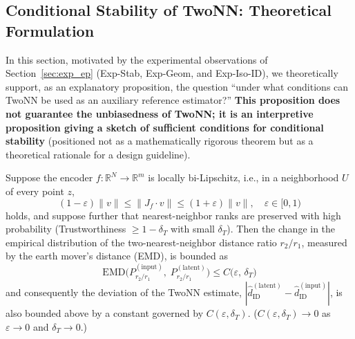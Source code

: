 \documentclass[make,article,submit,pdftex,moreauthors]{Definitions/mdpi}
\newcommand{\R}{\mathbb{R}}
\begin{document}
\subsection{Conditional Stability of TwoNN: Theoretical Formulation}\label{sec:theory_stability}

In this section, motivated by the experimental observations of
Section~\ref{sec:exp_ep} (Exp-Stab, Exp-Geom, and Exp-Iso-ID),
we theoretically support, as an explanatory proposition, the question
``under what conditions can TwoNN be used as an auxiliary reference estimator?''
\textbf{This proposition does not guarantee the unbiasedness of TwoNN;
it is an interpretive proposition giving a sketch of sufficient conditions for
conditional stability}
(positioned not as a mathematically rigorous theorem but as a theoretical rationale for
a design guideline).

\begin{Proposition}\label{thm:twonn_stability}
Suppose the encoder $f: \R^N \to \R^m$ is locally bi-Lipschitz,
i.e., in a neighborhood $U$ of every point $z$,
\begin{equation}
  (1-\varepsilon)\|v\| \leq \|J_f \cdot v\| \leq (1+\varepsilon)\|v\|,
  \quad \varepsilon \in [0,1)
  \label{eq:bilip}
\end{equation}
holds, and suppose further that nearest-neighbor ranks are preserved with high
probability (Trustworthiness $\geq 1 - \delta_T$ with small $\delta_T$).
Then the change in the empirical distribution of the two-nearest-neighbor distance ratio
$r_2/r_1$, measured by the earth mover's distance (EMD), is bounded as
\begin{equation}
  \mathrm{EMD}\bigl(P_{r_2/r_1}^{(\mathrm{input})},\; P_{r_2/r_1}^{(\mathrm{latent})}\bigr)
  \leq C\bigl(\varepsilon,\, \delta_T\bigr)
  \label{eq:twonn_stab}
\end{equation}
and consequently the deviation of the TwoNN estimate,
$|\hat{d}_\mathrm{ID}^{(\mathrm{latent})} - \hat{d}_\mathrm{ID}^{(\mathrm{input})}|$,
is also bounded above by a constant governed by $C(\varepsilon,\delta_T)$.
($C(\varepsilon, \delta_T) \to 0$ as $\varepsilon \to 0$ and $\delta_T \to 0$.)
\end{Proposition}
\end{document}
